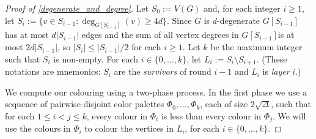 \documentclass{patmorin}
\newcommand{\defin}[1]{\emph{\color{brightmaroon}#1}}
\begin{document}
\begin{proof}[Proof of \cref{degenerate_and_degree}]
  Let $S_0:=V(G)$ and, for each integer $i\ge 1$, let $S_i:=\{v\in S_{i-1}:\deg_{G[S_{i-1}]}(v)\ge 4d\}$.  Since $G$ is $d$-degenerate $G[S_{i-1}]$ has at most $d|S_{i-1}|$ edges and the sum of all vertex degrees in $G[S_{i-1}]$is at most $2d|S_{i-1}|$, so $|S_i|\le |S_{i-1}|/2$ for each $i\ge 1$.  Let $k$ be the maximum integer such that $S_i$ is non-empty.  For each $i\in\{0,\ldots,k\}$, let $L_i:=S_i\setminus S_{i+1}$.  (These notations are mnemonics: $S_i$ are the \defin{survivors} of round $i-1$ and $L_i$ is \defin{layer} $i$.)


  We compute our colouring using a two-phase process. In the first phase we use a sequence of pairwise-disjoint color palettes $\Phi_0,\ldots,\Phi_{k}$, each of size $2\sqrt{\Delta}$, such that for each $1\le i < j\le k$, every colour in $\Phi_i$ is less than every colour in $\Phi_j$.  We will use the colours in $\Phi_i$ to colour the vertices in $L_i$, for each $i\in\{0,\ldots,k\}$.



\end{proof}
\end{document}
